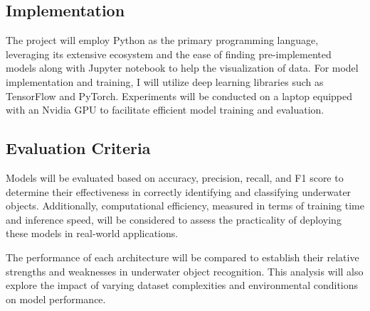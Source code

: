 \subsection{Implementation}

The project will employ Python as the primary programming language,
leveraging its extensive ecosystem and the ease of finding pre-implemented
models along with Jupyter notebook to help the visualization of data.
For model implementation and training, I will utilize deep learning
libraries such as TensorFlow and PyTorch.
Experiments will be conducted on a laptop equipped with an Nvidia GPU
to facilitate efficient model training and evaluation.

\subsection{Evaluation Criteria}

Models will be evaluated based on accuracy, precision, recall, and F1 score
to determine their effectiveness in correctly identifying and classifying
underwater objects.
Additionally, computational efficiency, measured in terms of training time
and inference speed, will be considered to assess the practicality
of deploying these models in real-world applications.

The performance of each architecture will be compared to establish
their relative strengths and weaknesses in underwater object recognition.
This analysis will also explore the impact of varying dataset complexities
and environmental conditions on model performance.